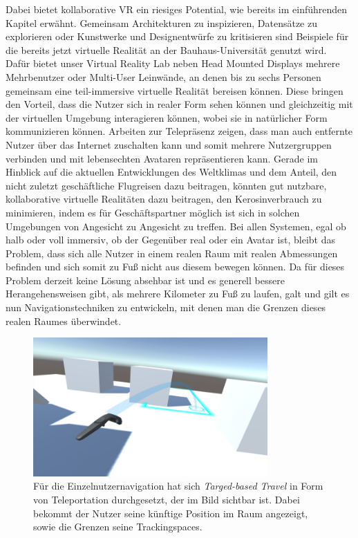Dabei bietet kollaborative VR ein riesiges Potential, wie bereits im einführenden Kapitel erwähnt. Gemeinsam Architekturen zu inspizieren, Datensätze zu explorieren oder Kunstwerke und Designentwürfe zu kritisieren sind Beispiele für die bereits jetzt virtuelle Realität an der Bauhaus-Universität genutzt wird. Dafür bietet unser Virtual Reality Lab neben Head Mounted Displays mehrere Mehrbenutzer oder Multi-User Leinwände, an denen bis zu sechs Personen gemeinsam eine teil-immersive virtuelle Realität bereisen können\cite{Kulik2011C1x6}. Diese bringen den Vorteil, dass die Nutzer sich in realer Form sehen können und gleichzeitig mit der virtuellen Umgebung interagieren können, wobei sie in natürlicher Form kommunizieren können.
Arbeiten zur Telepräsenz\cite{BeckImmersiveTelepresence} zeigen, dass man auch entfernte Nutzer über das Internet zuschalten kann und somit mehrere Nutzergruppen verbinden und mit lebensechten Avataren repräsentieren kann. 
Gerade im Hinblick auf die aktuellen Entwicklungen des Weltklimas und dem Anteil, den nicht zuletzt geschäftliche Flugreisen dazu beitragen, könnten gut nutzbare, kollaborative virtuelle Realitäten dazu beitragen, den Kerosinverbrauch zu minimieren, indem es für Geschäftspartner möglich ist sich in solchen Umgebungen \glqq von Angesicht zu Angesicht \grqq{} zu treffen.
Bei allen Systemen, egal ob halb oder voll immersiv, ob der Gegenüber real oder ein Avatar ist, bleibt das Problem, dass sich alle Nutzer in einem realen Raum mit realen Abmessungen befinden und sich somit zu Fuß nicht aus diesem bewegen können. Da für dieses Problem derzeit keine Lösung absehbar ist und es generell bessere Herangehensweisen gibt, als mehrere Kilometer zu Fuß zu laufen, galt und gilt es nun Navigationstechniken zu entwickeln, mit denen man die Grenzen dieses realen Raumes überwindet.

\begin{figure}[H]
	\centering
		\includegraphics[width=0.8\textwidth]{images/steam_teleport.jpg}
	\caption{Für die Einzelnutzernavigation hat sich \textit{Targed-based Travel} in Form von Teleportation durchgesetzt, der im Bild sichtbar ist. Dabei bekommt der Nutzer seine künftige Position im Raum angezeigt, sowie die Grenzen seine Trackingspaces.}
\end{figure}


